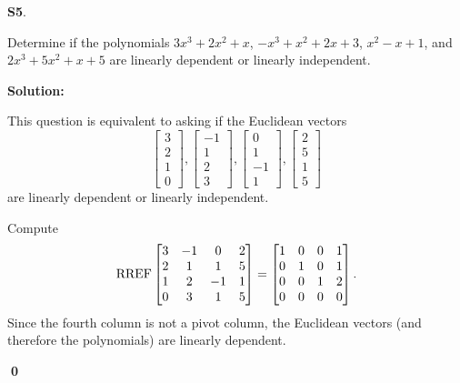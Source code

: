 \documentclass{article}
\newenvironment{problem}[1]
{
	\begin{flushleft}
	\textbf{#1}.
	\ignorespaces
}
{
	\end{flushleft}
}
\newenvironment{solution}
{
	\ignorespaces
	\textbf{Solution:}
}
{
	\ignorespacesafterend
	\begin{flushright}
	{\bfseries \qed}
	\end{flushright}
}
\begin{document}
\begin{problem}{S5}
Determine if the polynomials \(3x^3+2x^2+x\), \(-x^3+x^2+2x+3\), \(x^2-x+1\), and \(2x^3+5x^2+x+5\)
are linearly dependent or linearly independent.
\end{problem}
\begin{solution}
This question is equivalent to asking if the Euclidean vectors
\[
	\begin{bmatrix} 3\\2\\1\\0\end{bmatrix},
	\begin{bmatrix} -1\\1\\2\\3\end{bmatrix},
	\begin{bmatrix} 0\\1\\-1\\1\end{bmatrix},
	\begin{bmatrix} 2\\5\\1\\5\end{bmatrix}
\]
are linearly dependent or linearly independent.

Compute
\[\operatorname{RREF} \begin{bmatrix} 3 & -1 & 0 & 2 \\ 2 & 1 & 1 & 5 \\ 1 & 2 & -1 & 1 \\ 0 & 3 & 1 & 5 \end{bmatrix} =
\begin{bmatrix} 1 & 0 & 0 & 1 \\ 0 & 1 & 0 & 1 \\ 0 & 0 & 1 & 2 \\ 0 & 0 & 0 & 0 \end{bmatrix}.\]
Since the fourth column is not a pivot column, the Euclidean vectors
(and therefore the polynomials) are linearly dependent.
\end{solution}
\end{document}

